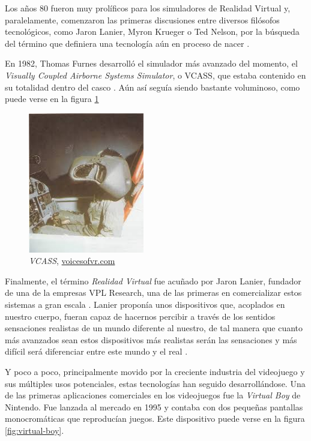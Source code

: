 Los años 80 fueron muy prolíficos para los simuladores de Realidad Virtual y, paralelamente, comenzaron las primeras discusiones entre diversos filósofos tecnológicos, como Jaron Lanier, Myron Krueger o Ted Nelson, por la búsqueda del término que definiera una tecnología aún en proceso de nacer \cite{lop-18}.

En 1982, Thomas Furnes desarrolló el simulador más avanzado del momento, el \textit{Visually Coupled Airborne Systems Simulator}, o VCASS, que estaba contenido en su totalidad dentro del casco \cite{cade-08}. Aún así seguía siendo bastante voluminoso, como puede verse en la figura \ref{fig:VCASS} 

\begin{figure}[H]
    \begin{center}
        \includegraphics[width=0.45\textwidth]{imagenes/2/VCASS.jpg}
        \caption{\textit{VCASS}, \url{voicesofvr.com}}
        \label{fig:VCASS}
    \end{center}
\end{figure}

Finalmente, el término \textit{Realidad Virtual} fue acuñado por Jaron Lanier, fundador de una de la empresas VPL Research, una de las primeras en comercializar estos sistemas a gran escala \cite{fer-02}. Lanier proponía unos dispositivos que, acoplados en nuestro cuerpo, fueran capaz de hacernos percibir a través de los sentidos sensaciones realistas de un mundo diferente al nuestro, de tal manera que cuanto más avanzados sean estos dispositivos más realistas serán las sensaciones y más difícil será diferenciar entre este mundo y el real \cite{lop-18}.

Y poco a poco, principalmente movido por la creciente industria del videojuego y sus múltiples usos potenciales, estas tecnologías han seguido desarrollándose. Una de las primeras aplicaciones comerciales en los videojuegos fue la \textit{Virtual Boy} de Nintendo. Fue lanzada al mercado en 1995 y contaba con dos pequeñas pantallas monocromáticas que reproducían juegos. Este dispositivo puede verse en la figura \ref{fig:virtual-boy}.

